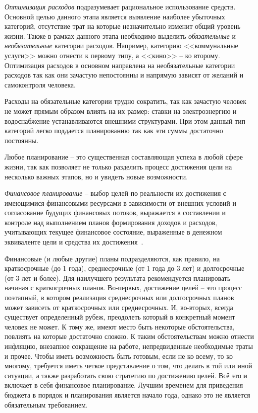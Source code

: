 \emph{Оптимизация расходов} подразумевает рациональное использование средств.
Основной целью данного этапа является выявление наиболее убыточных категорий, отсутствие трат на которые незначительно изменит общий уровень жизни. Также в рамках данного этапа необходимо выделить \emph{обязательные} и \emph{необязательные} категории расходов.
Например, категорию <<коммунальные услуги>> можно отнести к первому типу, а <<кино>> -- ко второму.
Оптимизация расходов в основном направлена на необязательные категории расходов так как они зачастую непостоянны и напрямую зависят от желаний и самоконтроля человека.

Расходы на обязательные категории трудно сократить, так как зачастую человек не может прямым образом влиять на их размер: ставки на электроэнергию и водоснабжение устанавливаются внешними структурами.
При этом данный тип категорий легко поддается планированию так как эти суммы достаточно постоянны.

Любое планирование -- это существенная составляющая успеха в любой сфере жизни, так как позволяет не только разделить процесс достижения цели на несколько важных этапов, но и увидеть новые возможности.

\emph{Финансовое планирование} -- выбор целей по реальности их достижения с имеющимися финансовыми ресурсами в зависимости от внешних условий и согласование будущих финансовых потоков, выражается в составлении и контроле над выполнением планов формирования доходов и расходов, учитывающих текущее финансовое состояние, выраженные в денежном эквиваленте цели и средства их достижения~\cite{finance_planning}.

Финансовые (и любые другие) планы подразделяются, как правило, на краткосрочные (до 1 года), среднесрочные (от 1 года до 3 лет) и долгосрочные (от 3 лет и более).
Для наилучшего результата рекомендуется планировать начиная с краткосрочных планов.
Во-первых, достижение целей -- это процесс поэтапный, в котором реализация среднесрочных или долгосрочных планов может зависеть от краткосрочных или среднесрочных.
И, во-вторых, всегда существует определенный рубеж, преодолеть который в конкретный момент человек не может.
К тому же, имеют место быть некоторые обстоятельства, повлиять на которые достаточно сложно.
К таким обстоятельствам можно отнести инфляцию, внезапное сокращение на работе, непредвиденные необходимые траты и прочее.
Чтобы иметь возможность быть готовым, если не ко всему, то ко многому, требуется иметь четкое представление о том, что делать в той или иной ситуации, а также разработать свою стратегию по достижению целей.
Всё это и включает в себя финансовое планирование.
Лучшим временем для приведения бюджета в порядок и планирования является начало года, однако это не является обязательным требованием.

